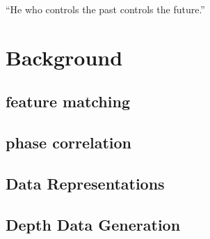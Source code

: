 \begin{savequote}[8cm]
  ``He who controls the past controls the future.''
\end{savequote}
\makeatletter
\chapter{Background}

\section{feature matching}

\section{phase correlation}

\section{Data Representations}

\section{Depth Data Generation}
\label{DepthDataGenSection}

